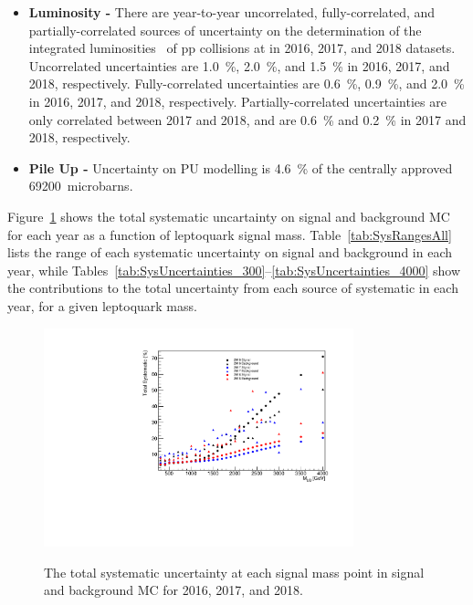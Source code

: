 \begin{itemize}
\item \textbf{Luminosity - }
There are year-to-year uncorrelated, fully-correlated, and partially-correlated sources of uncertainty on the determination of the integrated luminosities~\cite{CMS:LUM-17-003}\cite{CMS:LUM-17-004}\cite{CMS:LUM-18-002} of pp collisions at  in 2016, 2017, and 2018 datasets. Uncorrelated uncertainties are \SI{1.0}{\%}, \SI{2.0}{\%}, and \SI{1.5}{\%} in 2016, 2017, and 2018, respectively. Fully-correlated uncertainties are \SI{0.6}{\%}, \SI{0.9}{\%}, and \SI{2.0}{\%} in 2016, 2017, and 2018, respectively. Partially-correlated uncertainties are only correlated between 2017 and 2018, and are \SI{0.6}{\%} and \SI{0.2}{\%} in 2017 and 2018, respectively.

\item \textbf{Pile Up - }
Uncertainty on PU modelling is \SI{4.6}{\%} of the centrally approved 69200~microbarns. 
\end{itemize}

Figure~\ref{fig:totalSyst} shows the total systematic uncartainty on signal and background MC for each year as a function of leptoquark signal mass. Table~\ref{tab:SysRangesAll} lists the range of each systematic uncertainty on signal and background in each year, while Tables~\ref{tab:SysUncertainties_300}--\ref{tab:SysUncertainties_4000} show the contributions to the total uncertainty from each source of systematic in each year, for a given leptoquark mass.

\begin{figure}[H]
    \centering
    {\includegraphics[width=0.8\textwidth]{Images/Analysis/TotalSysVsLQMass.pdf}}
    \caption{The total systematic uncertainty at each signal mass point in signal and background MC for 2016, 2017, and 2018.}
    \label{fig:totalSyst}
\end{figure}

